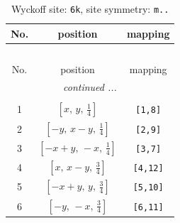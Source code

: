 \documentclass[fleqn,8pt]{jsarticle}
\begin{document}
\renewcommand{\arraystretch}{1.2}
\begin{longtable}{ccc}
\caption{Wyckoff site: {\tt 6k}, site symmetry: {\tt m..}}
 \\
 \hline \hline
No. & position & mapping \\ \hline \endfirsthead

\multicolumn{2}{l}{\tablename\ \thetable{}} \\
 \hline \hline
No. & position & mapping \\ \hline \endhead

 \hline \hline
\multicolumn{2}{r}{\footnotesize\it continued ...} \\ \endfoot

 \hline \hline
\multicolumn{2}{r}{} \\ \endlastfoot

1 & $\left[ x,\, y,\, \frac{1}{4} \right]$ & {\tt [1,8]} \\ \hline
2 & $\left[ - y,\, x - y,\, \frac{1}{4} \right]$ & {\tt [2,9]} \\ \hline
3 & $\left[ - x + y,\, - x,\, \frac{1}{4} \right]$ & {\tt [3,7]} \\ \hline
4 & $\left[ x,\, x - y,\, \frac{3}{4} \right]$ & {\tt [4,12]} \\ \hline
5 & $\left[ - x + y,\, y,\, \frac{3}{4} \right]$ & {\tt [5,10]} \\ \hline
6 & $\left[ - y,\, - x,\, \frac{3}{4} \right]$ & {\tt [6,11]} \\
\end{longtable}
\renewcommand{\arraystretch}{1.2}
\end{document}
